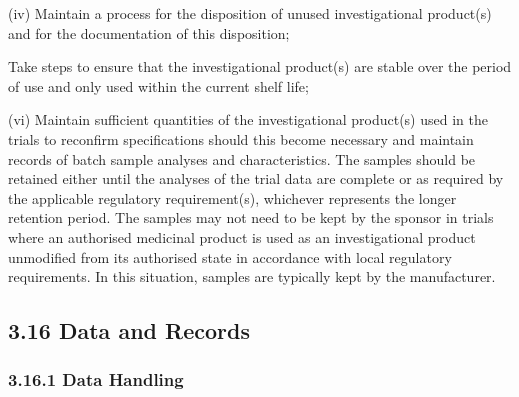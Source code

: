 \documentclass[11pt]{article}
\begin{document}
(iv) Maintain a process for the disposition of unused investigational product(s) and for the documentation of this disposition;


\begin{description}[leftmargin=2.5cm,style=sameline]

\item[(v)] Take steps to ensure that the investigational product(s) are stable over the period of use and only used within the current shelf life;

\end{description}

(vi) Maintain sufficient quantities of the investigational product(s) used in the trials to reconfirm specifications should this become necessary and maintain records of batch sample analyses and characteristics. The samples should be retained either until the analyses of the trial data are complete or as required by the applicable regulatory requirement(s), whichever represents the longer retention period. The samples may not need to be kept by the sponsor in trials where an authorised medicinal product is used as an investigational product unmodified from its authorised state in accordance with local regulatory requirements. In this situation, samples are typically kept by the manufacturer.


\subsection{3.16 Data and Records}

\subsubsection{3.16.1 Data Handling}
\end{document}
